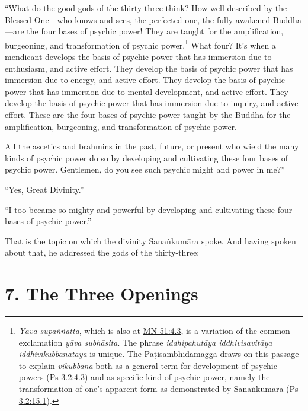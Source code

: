 \documentclass[12pt,openany]{book}%
\begin{document}
“What do the good gods of the thirty-three think? How well described by the Blessed One—who knows and sees, the perfected one, the fully awakened Buddha—are the four bases of psychic power! They are taught for the amplification, burgeoning, and transformation of psychic power.\footnote{\textit{\textsanskrit{Yāva} \textsanskrit{supaññattā}}, which is also at \href{https://suttacentral.net/mn51/en/sujato\#4.3}{MN 51:4.3}, is a variation of the common exclamation \textit{\textsanskrit{yāva} \textsanskrit{subhāsita}}. The phrase \textit{\textsanskrit{iddhipahutāya} \textsanskrit{iddhivisavitāya} \textsanskrit{iddhivikubbanatāya}} is unique. The \textsanskrit{Paṭisambhidāmagga} draws on this passage to explain \textit{vikubbana} both as a general term for development of psychic powers (\href{https://suttacentral.net/ps3.2/en/sujato\#4.3}{Ps 3.2:4.3}) and as specific kind of psychic power, namely the transformation of one’s apparent form as demonstrated by \textsanskrit{Sanaṅkumāra} (\href{https://suttacentral.net/ps3.2/en/sujato\#15.1}{Ps 3.2:15.1}). } What four? It’s when a mendicant develops the basis of psychic power that has immersion due to enthusiasm, and active effort. They develop the basis of psychic power that has immersion due to energy, and active effort. They develop the basis of psychic power that has immersion due to mental development, and active effort. They develop the basis of psychic power that has immersion due to inquiry, and active effort. These are the four bases of psychic power taught by the Buddha for the amplification, burgeoning, and transformation of psychic power. 

All the ascetics and brahmins in the past, future, or present who wield the many kinds of psychic power do so by developing and cultivating these four bases of psychic power. Gentlemen, do you see such psychic might and power in me?” 

“Yes, Great Divinity.” 

“I too became so mighty and powerful by developing and cultivating these four bases of psychic power.” 

That is the topic on which the divinity \textsanskrit{Sanaṅkumāra} spoke. And having spoken about that, he addressed the gods of the thirty-three: 

\section*{7. The Three Openings }
\end{document}
